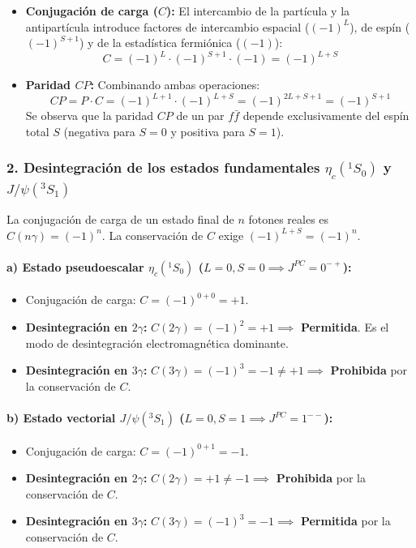 \begin{problema}
\begin{itemize}
    \item \textbf{Conjugación de carga ($C$):} El intercambio de la partícula y la antipartícula introduce factores de intercambio espacial ($(-1)^L$), de espín ($(-1)^{S+1}$) y de la estadística fermiónica ($(-1)$):
    \begin{equation*}
    C = (-1)^L \cdot (-1)^{S+1} \cdot (-1) = (-1)^{L+S}
    \end{equation*}

    \item \textbf{Paridad $CP$:} Combinando ambas operaciones:
    \begin{equation*}
    CP = P \cdot C = (-1)^{L+1} \cdot (-1)^{L+S} = (-1)^{2L + S + 1} = (-1)^{S+1}
    \end{equation*}
    Se observa que la paridad $CP$ de un par $f\bar{f}$ depende exclusivamente del espín total $S$ (negativa para $S=0$ y positiva para $S=1$).
\end{itemize}

\subsubsection*{2. Desintegración de los estados fundamentales $\eta_c(^1S_0)$ y $J/\psi(^3S_1)$}

La conjugación de carga de un estado final de $n$ fotones reales es $C(n\gamma) = (-1)^n$. La conservación de $C$ exige $(-1)^{L+S} = (-1)^n$.

\paragraph{a) Estado pseudoescalar $\eta_c(^1S_0)$ ($L=0, S=0 \implies J^{PC} = 0^{-+}$):}
\begin{itemize}
    \item Conjugación de carga: $C = (-1)^{0+0} = +1$.
    \item \textbf{Desintegración en $2\gamma$:} $C(2\gamma) = (-1)^2 = +1 \implies$ \textbf{Permitida}. Es el modo de desintegración electromagnética dominante.
    \item \textbf{Desintegración en $3\gamma$:} $C(3\gamma) = (-1)^3 = -1 \neq +1 \implies$ \textbf{Prohibida} por la conservación de $C$.
\end{itemize}

\paragraph{b) Estado vectorial $J/\psi(^3S_1)$ ($L=0, S=1 \implies J^{PC} = 1^{--}$):}
\begin{itemize}
    \item Conjugación de carga: $C = (-1)^{0+1} = -1$.
    \item \textbf{Desintegración en $2\gamma$:} $C(2\gamma) = +1 \neq -1 \implies$ \textbf{Prohibida} por la conservación de $C$.
    \item \textbf{Desintegración en $3\gamma$:} $C(3\gamma) = (-1)^3 = -1 \implies$ \textbf{Permitida} por la conservación de $C$.
\end{itemize}


\end{problema}
